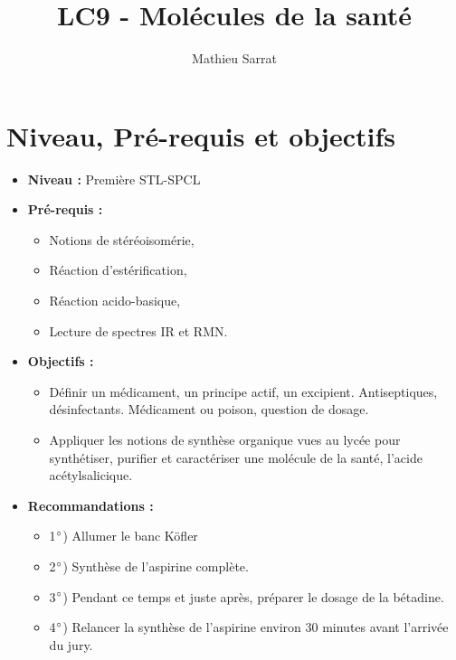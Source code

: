 \documentclass[11pt,a4paper]{report}
\author{Mathieu Sarrat}
\title{LC9 - Molécules de la santé}
\begin{document}
\maketitle

\section*{Niveau, Pré-requis et objectifs}
\begin{itemize}
	\item \textbf{Niveau :} Première STL-SPCL\\
	
	\item \textbf{Pré-requis :}
	\begin{itemize}
		\item Notions de stéréoisomérie,
		\item Réaction d’estérification,
		\item Réaction acido-basique,
		\item Lecture de spectres IR et RMN.\\
	\end{itemize}
	
	\item \textbf{Objectifs :}
	\begin{itemize}
		\item Définir un médicament, un principe actif, un excipient. Antiseptiques, désinfectants. 				Médicament ou poison, question de dosage.\\
		\item Appliquer les notions de synthèse organique vues au lycée pour synthétiser, purifier 
		et caractériser une molécule de la santé, l'acide acétylsalicique.\\ 
	\end{itemize}
		
	\item \textbf{Recommandations :}
	\begin{itemize}
	\item 1$\degree$) Allumer le banc Köfler
	\item 2$\degree$) Synthèse de l'aspirine complète.
	\item 3$\degree$) Pendant ce temps et juste après, préparer le dosage de la bétadine.
	\item 4$\degree$) Relancer la synthèse de l'aspirine environ 30 minutes avant l'arrivée du jury.
	\end{itemize}
\end{itemize}
\end{document}

